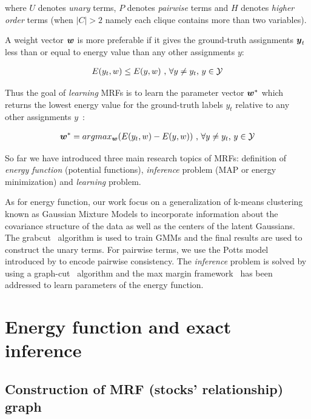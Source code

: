 \noindent where $U$ denotes \emph{unary} terms, $P$ denotes
\emph{pairwise} terms and $H$ denotes \emph{higher order} terms
(when $|C|>2$ namely each clique contains more than two
variables).

A weight vector ${\boldsymbol{w}}$ is more preferable if it gives the
ground-truth assignments ${\boldsymbol{y}}_t$ less than or equal to energy
value than any other assignments $y$:

\begin{align}
E(y_t,w)\leq E(y,w)~ \text{,~}\forall y \neq y_t
\text{,~} y\in \Y
\end{align}


Thus the goal of \emph{learning} MRFs is to learn the parameter
vector ${\boldsymbol{w}}^*$ which returns the lowest energy value for the
ground-truth labels $y_t$ relative to any other assignments
$y$~\cite{Szummer:ECCV08}:

\begin{align}
\bw^* = argmax_{\bw}(E(y_t,w)-E(y,w))~ \text{,~}\forall y \neq y_t
\text{,~} y\in \Y
\end{align}

So far we have introduced three main research topics of MRFs:
definition of \emph{energy function} (potential functions),
\emph{inference} problem (MAP or energy minimization) and
\emph{learning} problem.

As for energy function, our work focus on a generalization of
k-means clustering known as Gaussian Mixture Models to
incorporate information about the covariance structure of the
data as well as the centers of the latent Gaussians. The
grabcut~\cite{Rother:SIGGRAPH04} algorithm is used to train GMMs
and the final results are used to construct the unary terms. For
pairwise terms, we use the Potts model introduced by
 to encode pairwise consistency. The
\emph{inference} problem is solved by using a
graph-cut~\cite{Boykov:ICCV99, Boykov:PAMI04} algorithm and the
max margin framework~\cite{tsochantaridis2005large} has been
addressed to learn parameters of the energy function.

\section{Energy function and exact inference}
\label{sec:energy_and_inference}


\subsection{Construction of MRF (stocks' relationship) graph}
\label{sec:con_stock_graph}

